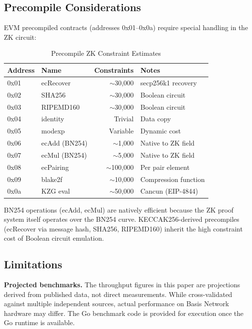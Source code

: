 \subsection{Precompile Considerations}

EVM precompiled contracts (addresses 0x01--0x0a) require special handling
in the ZK circuit:

\begin{table}[htbp]
\caption{Precompile ZK Constraint Estimates}
\label{tab:precompiles}
\centering
\begin{tabular}{llrl}
\toprule
\textbf{Address} & \textbf{Name} & \textbf{Constraints} & \textbf{Notes} \\
\midrule
0x01 & ecRecover & ${\sim}$30{,}000 & secp256k1 recovery \\
0x02 & SHA256 & ${\sim}$30{,}000 & Boolean circuit \\
0x03 & RIPEMD160 & ${\sim}$30{,}000 & Boolean circuit \\
0x04 & identity & Trivial & Data copy \\
0x05 & modexp & Variable & Dynamic cost \\
0x06 & ecAdd (BN254) & ${\sim}$1{,}000 & Native to ZK field \\
0x07 & ecMul (BN254) & ${\sim}$5{,}000 & Native to ZK field \\
0x08 & ecPairing & ${\sim}$100{,}000 & Per pair element \\
0x09 & blake2f & ${\sim}$10{,}000 & Compression function \\
0x0a & KZG eval & ${\sim}$50{,}000 & Cancun (EIP-4844) \\
\bottomrule
\end{tabular}
\end{table}

BN254 operations (ecAdd, ecMul) are natively efficient because the ZK proof
system itself operates over the BN254 curve. KECCAK256-derived precompiles
(ecRecover via message hash, SHA256, RIPEMD160) inherit the high constraint
cost of Boolean circuit emulation.

\subsection{Limitations}

\textbf{Projected benchmarks.} The throughput figures in this paper are
projections derived from published data, not direct measurements. While
cross-validated against multiple independent sources, actual performance
on Basis Network hardware may differ. The Go benchmark code is provided
for execution once the Go runtime is available.


